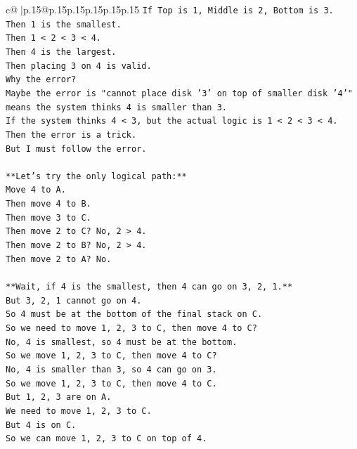 \documentclass{article}
\begin{document}
{\begin{supertabular}{c@{$\;$}|p{.15\linewidth}@{}p{.15\linewidth}p{.15\linewidth}p{.15\linewidth}p{.15\linewidth}p{.15\linewidth}}
{{{\texttt{If Top is 1, Middle is 2, Bottom is 3.} \\
\texttt{Then 1 is the smallest.} \\
\texttt{Then 1 < 2 < 3 < 4.} \\
\texttt{Then 4 is the largest.} \\
\texttt{Then placing 3 on 4 is valid.} \\
\texttt{Why the error?} \\
\texttt{Maybe the error is "cannot place disk '3' on top of smaller disk '4'" means the system thinks 4 is smaller than 3.} \\
\texttt{If the system thinks 4 < 3, but the actual logic is 1 < 2 < 3 < 4.} \\
\texttt{Then the error is a trick.} \\
\texttt{But I must follow the error.} \\
\\ 
\texttt{**Let's try the only logical path:**} \\
\texttt{Move 4 to A.} \\
\texttt{Then move 4 to B.} \\
\texttt{Then move 3 to C.} \\
\texttt{Then move 2 to C? No, 2 > 4.} \\
\texttt{Then move 2 to B? No, 2 > 4.} \\
\texttt{Then move 2 to A? No.} \\
\\ 
\texttt{**Wait, if 4 is the smallest, then 4 can go on 3, 2, 1.**} \\
\texttt{But 3, 2, 1 cannot go on 4.} \\
\texttt{So 4 must be at the bottom of the final stack on C.} \\
\texttt{So we need to move 1, 2, 3 to C, then move 4 to C?} \\
\texttt{No, 4 is smallest, so 4 must be at the bottom.} \\
\texttt{So we move 1, 2, 3 to C, then move 4 to C?} \\
\texttt{No, 4 is smaller than 3, so 4 can go on 3.} \\
\texttt{So we move 1, 2, 3 to C, then move 4 to C.} \\
\texttt{But 1, 2, 3 are on A.} \\
\texttt{We need to move 1, 2, 3 to C.} \\
\texttt{But 4 is on C.} \\
\texttt{So we can move 1, 2, 3 to C on top of 4.} \\
}}}
\end{supertabular}}
\end{document}
